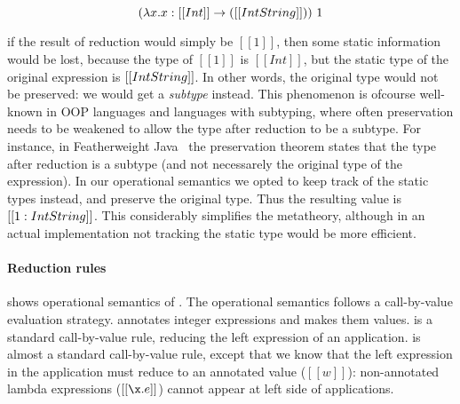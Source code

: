 \[(\lambda x . x : [[Int]] \to ([[Int \/ String]]))~1\]

\noindent if the result of reduction would simply be $[[1]]$, then some
static information would be lost, because the type of $[[1]]$ is $[[Int]]$,
but the static type of the original expression is $[[Int \/ String]]$.
In other words, the original type would not be preserved: we
would get a \emph{subtype} instead. This phenomenon is ofcourse well-known
in OOP languages and languages with subtyping, where often preservation
needs to be weakened to allow the type after reduction to be a subtype.
For instance, in Featherweight Java~\cite{DBLP:journals/toplas/IgarashiPW01}
the preservation theorem states that the type after reduction is a
subtype (and not necessarely the original type of the expression). In our
operational semantics we opted to keep track of the static types instead,
and preserve the original type. Thus the resulting value is $[[1 : Int \/ String]]$.
This considerably simplifies the metatheory, although in an actual
implementation not tracking the static type would be more efficient.

\paragraph{Reduction rules}
 shows operational semantics of \cal.
The operational semantics follows a call-by-value evaluation strategy.
 annotates integer expressions and makes them
values.  is a standard call-by-value rule, reducing
the left expression of an application.
 is almost a standard call-by-value rule, except
that we know that the left expression in the application must reduce
to an annotated value ($[[w]]$): non-annotated lambda expressions
($[[\x.e]]$) cannot appear at left side of applications.

